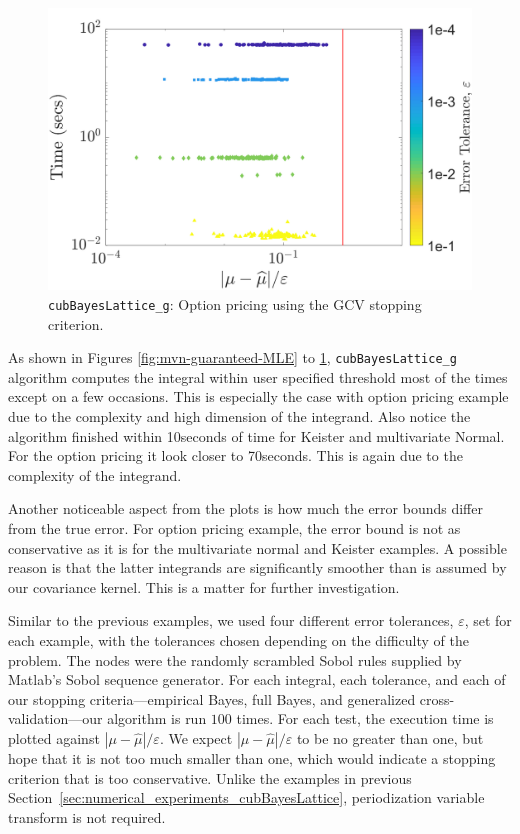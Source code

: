 \documentclass{iitthesis}          %
\newcommand{\hmu}{\widehat{\mu}}
\newcommand{\code}[1]{\texttt{#1}}
\def\abs#1{\ensuremath{\left \lvert #1 \right \rvert}}
\newcommand\secref{Section~\ref}
\begin{document}
\begin{figure}
	\centering
	\includegraphics[width=0.95\linewidth]{"optPrice_guaranteed_time_GCV_Baker_d12_r1_2018-Sep-6"}
	\caption[OptPrice guaranteed : GCV]{\code{cubBayesLattice\_g}: Option pricing using the  GCV stopping criterion.} \label{fig:optprice-guaranteed-GCV}
\end{figure}


As shown in Figures \ref{fig:mvn-guaranteed-MLE} to \ref{fig:optprice-guaranteed-GCV}, \code{cubBayesLattice\_g} algorithm computes the integral within user specified threshold most of the times except on a few occasions. This is especially the case with option pricing example due to the complexity and high dimension of the integrand. 
Also notice the algorithm finished within 10seconds of time for Keister and multivariate Normal. For the option pricing it look closer to 70seconds. This is again due to the complexity of the integrand.

Another noticeable aspect from the plots is how much the error bounds differ from the true error. For option pricing example, the error bound is not as conservative as it is for the multivariate normal and Keister examples. A possible reason is that the latter integrands are significantly smoother than is assumed by our covariance kernel.  This is a matter for further investigation.






\label{sec:numerical_experiments_cubBayesNet}

Similar to the previous examples, we used four different error tolerances, $\varepsilon$,  set for each example, with the tolerances chosen depending on the difficulty of the problem.  The nodes were the randomly scrambled Sobol rules supplied by Matlab's Sobol sequence generator.  For each integral,  each tolerance, and each of our stopping criteria---empirical Bayes, full Bayes, and generalized cross-validation---our algorithm is run  $100$ times.  For each test, the execution time is plotted against $\abs{\mu - \hmu}/\varepsilon$.  We expect $\abs{\mu - \hmu}/\varepsilon$ to be no greater than one, but hope that it is not too much smaller than one, which would indicate a stopping criterion that is too conservative. Unlike the examples in  previous \secref{sec:numerical_experiments_cubBayesLattice}, periodization variable transform is not required.
\end{document}
